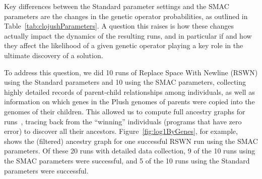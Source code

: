 Key differences between the Standard parameter settings and the SMAC parameters
are the changes in the genetic operator probabilities, as outlined in
Table~\ref{tab:clojushParameters}. 
A question this raises is how these changes
actually impact the dynamics of the resulting runs, and in particular if and
how they affect the likelihood of a given genetic operator playing a key
role in the ultimate discovery of a solution.


\begin{figure*}
	\caption{Ancestry graph of a successful Replace Space With Newline run
	using the ``tuned'' parameters discovered by SMAC. This tree is filtered 
	to only include individuals that ultimately passed a gene
	on to the winning individual. Each individual is represented as a
	rectangle whose width is proportional to the number of selections
	it received, and whose color is a function of its error vector.
	Edges indicate parent-child relationships. Dashed black edges indicate
	that the child was constructed via alternation alone; solid black edges 
	indicate alternation followed by uniform mutation. Solid orange edges
	indicate applications of uniform mutation, and dashed orange represent
	applications of uniform close mutation.}
	\label{fig:log1ByGenes}
\end{figure*}

To address this question, we did 10 runs of Replace Space With Newline (RSWN) 
using the Standard parameters and 10 using the SMAC parameters, 
collecting highly detailed records of parent-child relationships 
among individuals, as well as information on which genes in the Plush 
genomes of parents were copied into
the genomes of their children. This allowed us to compute full ancestry
graphs for 
runs~\cite{McPhee:2016:VGP:2908961.2931741,McPhee:2015:GPTP,McPhee:2016:GPTP},
tracing back from the ``winning'' individuals (programs that have zero error)
to discover all their ancestors. Figure~\ref{fig:log1ByGenes}, for example,
shows the (filtered) ancestry graph for one successful RSWN run 
using the SMAC parameters. Of these 20 runs with detailed data collection,
9 of the 10 runs using the SMAC parameters were successful, and 5 of the
10 runs using the Standard parameters were successful.

